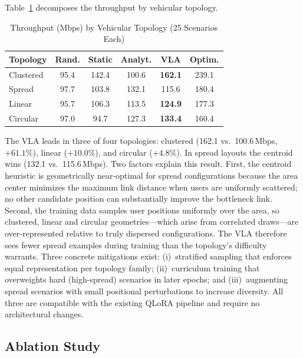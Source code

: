 \documentclass[journal]{IEEEtran}
\begin{document}
Table~\ref{tab:by_type} decomposes the throughput by vehicular topology.

\begin{table}[!t]
    \centering
    \caption{Throughput (Mbps) by Vehicular Topology (25 Scenarios Each)}
    \label{tab:by_type}
    \begin{tabular}{lccccc}
        \toprule
        \textbf{Topology} & \textbf{Rand.} & \textbf{Static} & \textbf{Analyt.} & \textbf{VLA} & \textbf{Optim.} \\
        \midrule
        Clustered & 95.4 & 142.4 & 100.6 & \textbf{162.1} & 239.1 \\
        Spread & 97.7 & 103.8 & 132.1 & 115.6 & 180.4 \\
        Linear & 95.7 & 106.3 & 113.5 & \textbf{124.9} & 177.3 \\
        Circular & 97.0 & 94.7 & 127.3 & \textbf{133.4} & 160.4 \\
        \bottomrule
    \end{tabular}
\end{table}

The VLA leads in three of four topologies: clustered (162.1 vs.\ 100.6\,Mbps, $+61.1\%$), linear ($+10.0\%$), and circular ($+4.8\%$). In spread layouts the centroid wins (132.1 vs.\ 115.6\,Mbps). Two factors explain this result. First, the centroid heuristic is geometrically near-optimal for spread configurations because the area center minimizes the maximum link distance when users are uniformly scattered; no other candidate position can substantially improve the bottleneck link. Second, the training data samples user positions uniformly over the area, so clustered, linear and circular geometries---which arise from correlated draws---are over-represented relative to truly dispersed configurations. The VLA therefore sees fewer spread examples during training than the topology's difficulty warrants. Three concrete mitigations exist: (i)~stratified sampling that enforces equal representation per topology family; (ii)~curriculum training that overweights hard (high-spread) scenarios in later epochs; and (iii)~augmenting spread scenarios with small positional perturbations to increase diversity. All three are compatible with the existing QLoRA pipeline and require no architectural changes.

\subsection{Ablation Study}
\label{sec:ablation}
\end{document}
